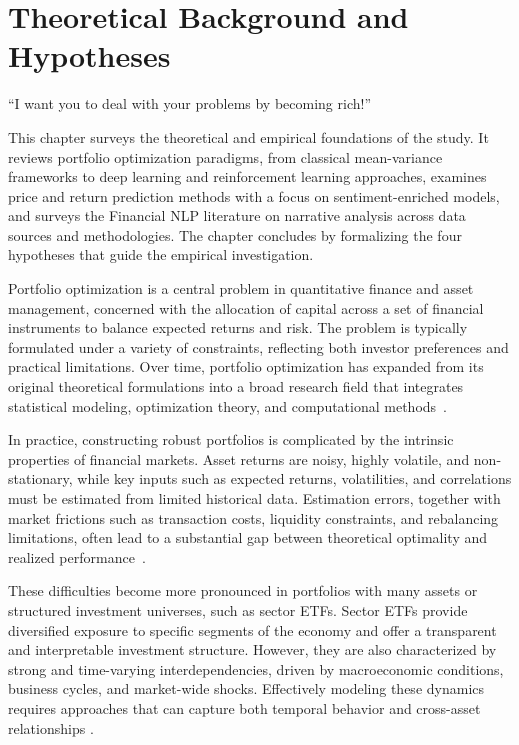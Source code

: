 \chapter{Theoretical Background and Hypotheses}
\label{chapter:sota}

\begin{introduction}
\begin{flushright}
``I want you to deal with your problems by becoming rich!''
\end{flushright}

\vspace{0.5em}

This chapter surveys the theoretical and empirical foundations of the study. It reviews portfolio optimization paradigms, from classical mean-variance frameworks to deep learning and reinforcement learning approaches, examines price and return prediction methods with a focus on sentiment-enriched models, and surveys the Financial NLP literature on narrative analysis across data sources and methodologies. The chapter concludes by formalizing the four hypotheses that guide the empirical investigation.
\end{introduction}



Portfolio optimization is a central problem in quantitative finance and asset management, concerned with the allocation of capital across a set of financial instruments to balance expected returns and risk. The problem is typically formulated under a variety of constraints, reflecting both investor preferences and practical limitations. Over time, portfolio optimization has expanded from its original theoretical formulations into a broad research field that integrates statistical modeling, optimization theory, and computational methods~\cite{41bf8, 3ac6b}.

In practice, constructing robust portfolios is complicated by the intrinsic properties of financial markets. Asset returns are noisy, highly volatile, and non-stationary, while key inputs such as expected returns, volatilities, and correlations must be estimated from limited historical data. Estimation errors, together with market frictions such as transaction costs, liquidity constraints, and rebalancing limitations, often lead to a substantial gap between theoretical optimality and realized performance~\cite{41bf8}.

These difficulties become more pronounced in portfolios with many assets or structured investment universes, such as sector ETFs. Sector ETFs provide diversified exposure to specific segments of the economy and offer a transparent and interpretable investment structure. However, they are also characterized by strong and time-varying interdependencies, driven by macroeconomic conditions, business cycles, and market-wide shocks. Effectively modeling these dynamics requires approaches that can capture both temporal behavior and cross-asset relationships \cite{ALOMARI2024210}.

